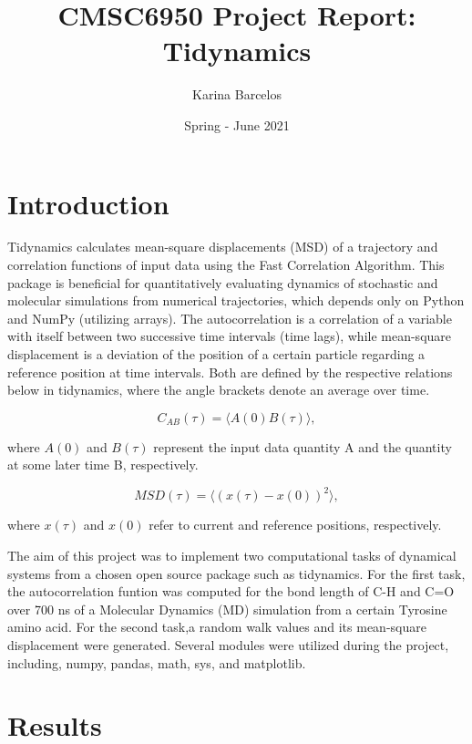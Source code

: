 \documentclass{article}
\title{CMSC6950 Project Report: Tidynamics}
\author{Karina Barcelos}
\date{Spring - June 2021}
\begin{document}
\maketitle

\section{Introduction}

Tidynamics \cite{Buyl2018} calculates mean-square displacements (MSD) of a trajectory and correlation functions of input data using the Fast Correlation Algorithm. \cite{kneller1995nmoldyn} This package is beneficial for quantitatively evaluating dynamics of stochastic and molecular simulations from numerical trajectories, which depends only on Python and NumPy (utilizing arrays). The autocorrelation is a correlation of a variable with itself between two successive time intervals (time lags), while mean-square displacement is a deviation of the position of a certain particle regarding a reference position at time intervals. Both are defined by the respective relations below in tidynamics, where the angle brackets denote an average over time. \cite{kneller1995nmoldyn}

\begin{equation}
C_{AB}(\tau) = \langle A(0) B(\tau) \rangle,
\label{correlation}
\end{equation}

where  $A(0)$ and $B(\tau)$ represent the input data quantity A and the quantity at some later time B, respectively.

\begin{equation}
MSD(\tau) = \langle (x(\tau) - x(0) )^2 \rangle,
\label{msd}
\end{equation}

where $x(\tau)$ and $x(0)$ refer to current and reference positions, respectively.\hfill \break

The aim of this project was to implement two computational tasks of dynamical systems from a chosen open source package such as tidynamics\cite{Buyl2018}. For the first task, the autocorrelation funtion was computed for the bond length of C-H and C=O over 700 ns of a Molecular Dynamics (MD) simulation from a certain Tyrosine amino acid. For the second task,a random walk values and its mean-square displacement were generated. Several modules were utilized during the project, including, numpy, pandas, math, sys, and matplotlib. 

\section{Results}
\end{document}
